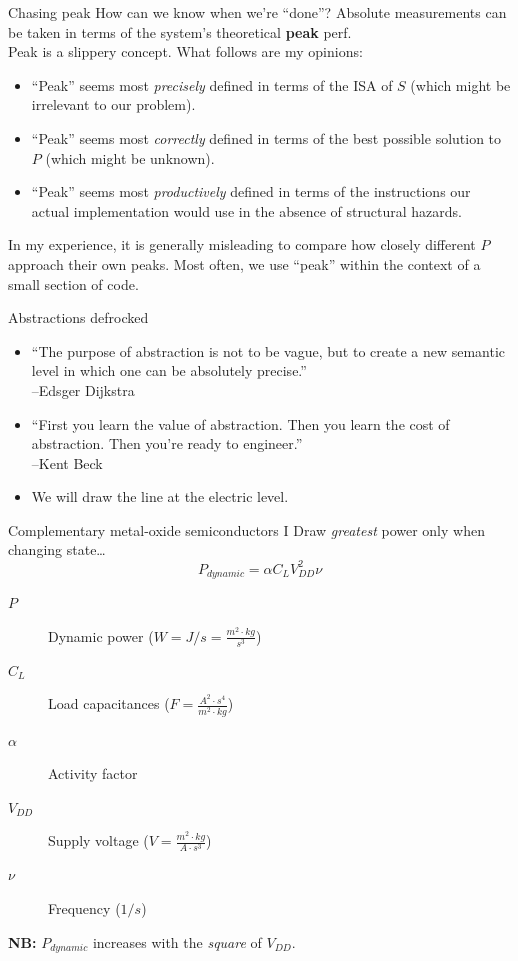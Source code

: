 \documentclass[xcolor={dvipsnames,table}]{beamer}
\begin{document}
\begin{frame}{Chasing peak}
How can we know when we're ``done''? Absolute measurements
can be taken in terms of the system's theoretical \textbf{peak} perf.\\
\vspace{.15in}
Peak is a slippery concept. What follows are my opinions:
\vspace{.15in}
\begin{itemize}
\item ``Peak'' seems most \textit{precisely} defined in terms of the ISA of $S$
(which might be irrelevant to our problem).
\item ``Peak'' seems most \textit{correctly} defined in terms of the best possible
solution to $P$ (which might be unknown).
\item ``Peak'' seems most \textit{productively} defined in terms of the instructions our actual
implementation would use in the absence of structural hazards.
\end{itemize}
\vspace{.15in}
In my experience, it is generally misleading to compare how closely
different $P$ approach their own peaks. Most often, we use ``peak'' within
the context of a small section of code.
\end{frame}

\begin{frame}{Abstractions defrocked}
\begin{itemize}
\item ``The purpose of abstraction is not to be vague, but to create a new semantic level in which one can be absolutely precise.''\\
\hfill--Edsger Dijkstra
\vfill
\item ``First you learn the value of abstraction. Then you learn the cost of abstraction. Then you're ready to engineer.''\\
\hfill--Kent Beck
\vfill
\item We will draw the line at the electric level.
\end{itemize}
\end{frame}

\begin{frame}{Complementary metal-oxide semiconductors I}
Draw \textit{greatest} power only when changing state\ldots
\begin{equation}
P_{dynamic} = \alpha C_LV_{DD}^{2}\nu
\end{equation}
\begin{description}
\item[$P$] Dynamic power ($W = J/s = \frac{m^{2}\cdot kg}{s^{3}}$)
\item[$C_L$] Load capacitances ($F = \frac{A^{2}\cdot s^{4}}{m^{2}\cdot kg}$)
\item[$\alpha$] Activity factor
\item[$V_{DD}$] Supply voltage ($V = \frac{m^{2}\cdot kg}{A\cdot s^{3}}$)
\item[$\nu$] Frequency ($1/s$)
\end{description}
\vfill
\textbf{NB:} $P_{dynamic}$ increases with the \textit{square} of $V_{DD}$.
\end{frame}
\end{document}
